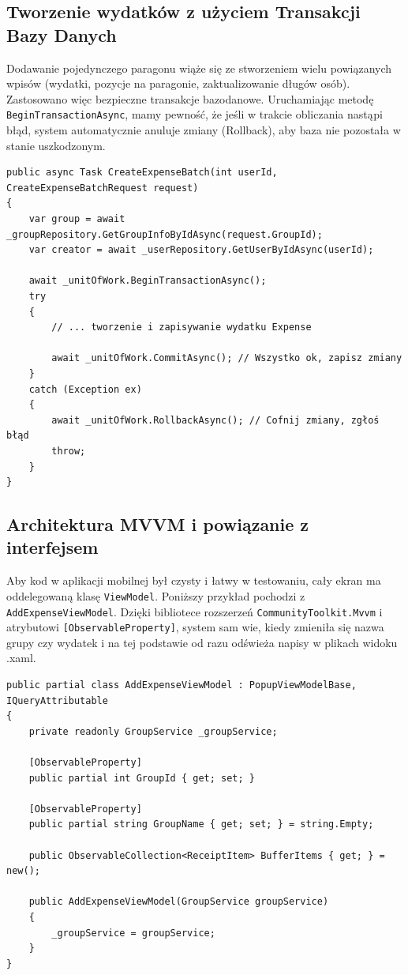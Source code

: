 \documentclass[12pt, a4paper]{article}
\begin{document}
\subsection{Tworzenie wydatków z użyciem Transakcji Bazy Danych}
Dodawanie pojedynczego paragonu wiąże się ze stworzeniem wielu powiązanych wpisów (wydatki, pozycje na paragonie, zaktualizowanie długów osób). Zastosowano więc bezpieczne transakcje bazodanowe. Uruchamiając metodę \texttt{BeginTransactionAsync}, mamy pewność, że jeśli w trakcie obliczania nastąpi błąd, system automatycznie anuluje zmiany (Rollback), aby baza nie pozostała w stanie uszkodzonym.
\begin{center}
\begin{verbatim}
public async Task CreateExpenseBatch(int userId, CreateExpenseBatchRequest request)
{
    var group = await _groupRepository.GetGroupInfoByIdAsync(request.GroupId);
    var creator = await _userRepository.GetUserByIdAsync(userId);

    await _unitOfWork.BeginTransactionAsync();
    try
    {
        // ... tworzenie i zapisywanie wydatku Expense
        
        await _unitOfWork.CommitAsync(); // Wszystko ok, zapisz zmiany
    }
    catch (Exception ex)
    {
        await _unitOfWork.RollbackAsync(); // Cofnij zmiany, zgłoś błąd
        throw;
    }
}
\end{verbatim}
\end{center}

\subsection{Architektura MVVM i powiązanie z interfejsem}
Aby kod w aplikacji mobilnej był czysty i łatwy w testowaniu, cały ekran ma oddelegowaną klasę \texttt{ViewModel}. Poniższy przykład pochodzi z \texttt{AddExpenseViewModel}. Dzięki bibliotece rozszerzeń \texttt{CommunityToolkit.Mvvm} i atrybutowi \texttt{[ObservableProperty]}, system sam wie, kiedy zmieniła się nazwa grupy czy wydatek i na tej podstawie od razu odświeża napisy w plikach widoku .xaml.
\begin{center}
\begin{verbatim}
public partial class AddExpenseViewModel : PopupViewModelBase, IQueryAttributable
{
    private readonly GroupService _groupService;

    [ObservableProperty]
    public partial int GroupId { get; set; }

    [ObservableProperty]
    public partial string GroupName { get; set; } = string.Empty;

    public ObservableCollection<ReceiptItem> BufferItems { get; } = new();

    public AddExpenseViewModel(GroupService groupService)
    {
        _groupService = groupService;
    }
}
\end{verbatim}
\end{center}
\end{document}
